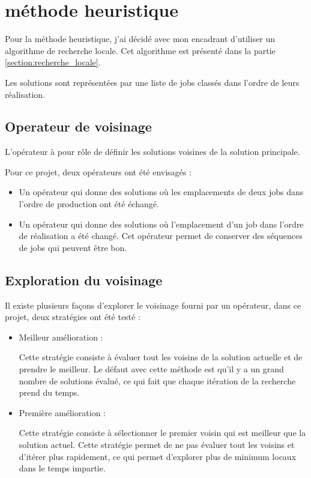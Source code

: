 

\section{méthode heuristique}
\label{section:analyse:methode_heuristique}

Pour la méthode heuristique, j'ai décidé avec mon encadrant d'utiliser un algorithme de recherche locale.
Cet algorithme est présenté dans la partie \autoref{section:recherche_locale}.
	
Les solutions sont représentées par une liste de jobs classés dans l'ordre de leurs réalisation.

\subsection{Operateur de voisinage}

L'opérateur à pour rôle de définir les solutions voisines de la solution principale.

Pour ce projet, deux opérateurs ont été envisagés :

\begin{itemize}
	\item Un opérateur qui donne des solutions où les emplacements de deux jobs dans l'ordre de production ont été échangé.
	\item Un opérateur qui donne des solutions où l'emplacement d'un job dans l'ordre de réalisation a été changé.
	Cet opérateur permet de conserver des séquences de jobs qui peuvent être bon.
\end{itemize}

\subsection{Exploration du voisinage}

Il existe plusieurs façons d'explorer le voisinage fourni par un opérateur, dans ce projet, deux stratégies ont été testé :
\begin{itemize}
	\item Meilleur amélioration :
	
	Cette stratégie consiste à évaluer tout les voisins de la solution actuelle et de prendre le meilleur.
	Le défaut avec cette méthode est qu'il y a un grand nombre de solutions évalué, ce qui fait que chaque itération de la recherche prend du temps.
	\item Première amélioration : 
	
	Cette stratégie consiste à sélectionner le premier voisin qui est meilleur que la solution actuel.
	Cette stratégie permet de ne pas évaluer tout les voisins et d'itérer plus rapidement, ce qui permet d'explorer plus de minimum locaux dans le temps impartie.
\end{itemize}


